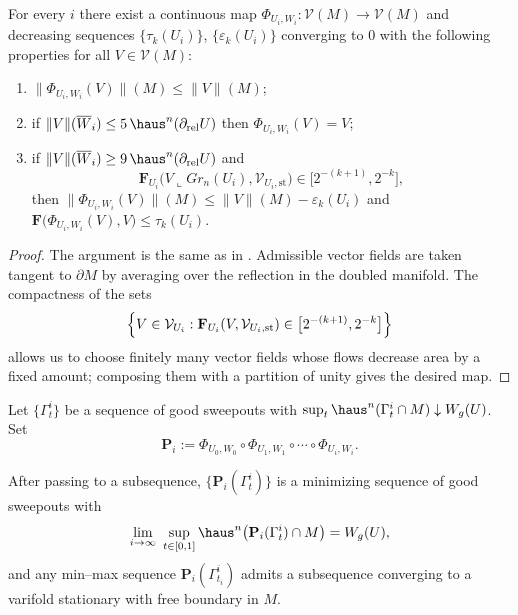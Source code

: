 \begin{lemma}\label{lem:extend-pull-tight}
For every $i$ there exist a continuous map $\Phi_{U_i,W_i}:\mathcal{V}(M)\to\mathcal{V}(M)$ and decreasing sequences $\{\tau_k(U_i)\}$, $\{\varepsilon_k(U_i)\}$ converging to $0$ with the following properties for all $V\in\mathcal{V}(M)$:
\begin{enumerate}
    \item $\|\Phi_{U_i,W_i}(V)\|(M)\le \|V\|(M)$;
    \item if $\|V\|(\overline{W}_i)\le 5\,\haus^n(\partial_{\mathrm{rel}}U)$ then $\Phi_{U_i,W_i}(V)=V$;
    \item if $\|V\|(\overline{W}_i)\ge 9\,\haus^n(\partial_{\mathrm{rel}}U)$ and
    \[
    \mathbf{F}_{U_i}\bigl(V\llcorner Gr_n(U_i),\mathcal{V}_{U_i,\mathrm{st}}\bigr)\in\bigl[2^{-(k+1)},2^{-k}\bigr],
    \]
    then $\|\Phi_{U_i,W_i}(V)\|(M)\le \|V\|(M)-\varepsilon_k(U_i)$ and $\mathbf{F}\bigl(\Phi_{U_i,W_i}(V),V\bigr)\le \tau_k(U_i)$.
\end{enumerate}
\end{lemma}

\begin{proof}
The argument is the same as in \cite[Lemma~8.8]{CL20}.  Admissible vector fields are taken tangent to $\partial M$ by averaging over the reflection in the doubled manifold.  The compactness of the sets
\[
\Bigl\{V\in\mathcal{V}_{U_i}: \mathbf{F}_{U_i}(V,\mathcal{V}_{U_i,\mathrm{st}})\in\bigl[2^{-(k+1)},2^{-k}\bigr]\Bigr\}
\]
allows us to choose finitely many vector fields whose flows decrease area by a fixed amount; composing them with a partition of unity gives the desired map.
\end{proof}

Let $\{\Gamma_t^i\}$ be a sequence of good sweepouts with $\sup_t \haus^n(\Gamma_t^i\cap M)\downarrow W_g(U)$.  Set
\[
\mathbf{P}_i:=\Phi_{U_0,W_0}\circ\Phi_{U_1,W_1}\circ\cdots\circ\Phi_{U_i,W_i}.
\]

\begin{proposition}\label{prop:pt-minimizing}
After passing to a subsequence, $\{\mathbf{P}_i(\Gamma_t^i)\}$ is a minimizing sequence of good sweepouts with
\[
\lim_{i\to\infty}\ \sup_{t\in[0,1]}\haus^n\bigl(\mathbf{P}_i(\Gamma_t^i)\cap M\bigr)=W_g(U),
\]
and any min--max sequence $\mathbf{P}_i(\Gamma_{t_i}^i)$ admits a subsequence converging to a varifold stationary with free boundary in $M$.
\end{proposition}

